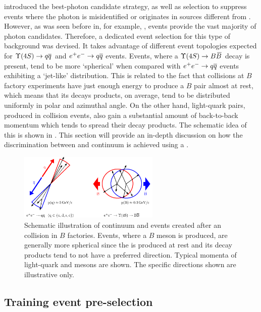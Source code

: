  introduced the best-photon candidate strategy, 
as well as selection to suppress events 
where the photon is misidentified or originates in sources different from \BtoXsgamma.
However, as was seen before in, for example, ,
\epem\ra\qqbar events provide the vast majority of photon candidates.
Therefore, a dedicated event selection for this type of background was devised.
It takes advantage of different event topologies expected for $\FourS\to\qqbar$ and $e^+e^-\rightarrow q\overline q$ events.
Events, where a $\FourS\to\BB$ decay is present, tend to be more `spherical' when compared with $e^+e^-\rightarrow q\overline q$ events exhibiting a `jet-like' distribution.
This is related to the fact that \epem collisions at $B$ factory experiments have just enough energy to produce a $B$ pair almost at rest, which means that its decays products, on average, tend to be distributed uniformly in polar and azimuthal angle.
On the other hand, light-quark pairs, produced in \epem collision events, also gain a substantial amount of back-to-back momentum which tends to spread their decay products. 
The schematic idea of this is shown in .
This section will provide an in-depth discussion on how the discrimination between \BtoXsgamma and continuum is achieved using a \BDT.

\begin{figure}[htbp!]
    \centering
    \includegraphics[width=0.6\textwidth]{figures/continuum_suppression/figure_continuum_suppression_event_shapes.pdf}
    \caption{\label{fig:continuum_schematic} Schematic illustration of continuum and \BB events created after an \epem collision in $B$ factories.
    Events, where a $B$ meson is produced, are generally more spherical since the \FourS is produced at rest and its decay products tend to not have a preferred direction.
    Typical momenta of light-quark and \BB mesons are shown.
    The specific directions shown are illustrative only. 
    }
\end{figure}

\subsection{Training event pre-selection}\label{sec:preselection}

